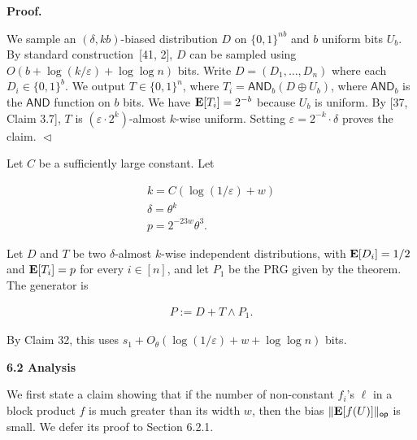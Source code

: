\documentclass[10pt,a4paper]{article}
\begin{document}



\par\medskip\noindent\textbf{
\textbf{Proof}.}\par




We sample an $(\delta,kb)$-biased distribution $D$ on $\{0,1\}^{nb}$ and $b$ uniform bits $U_{b}$.
By standard construction [41, 2], $D$ can be sampled using $O(b+\log(k/\varepsilon)+\log\log n)$ bits.
Write $D=(D_{1},\ldots,D_{n})$ where each $D_{i}\in\{0,1\}^{b}$.
We output $T\in\{0,1\}^{n}$, where $T_{i}=\mathsf{AND}_{b}(D\oplus U_{b})$, where $\mathsf{AND}_{b}$ is the $\mathsf{AND}$ function on $b$ bits.
We have $\mathop{\bf E\/}[T_{i}]=2^{-b}$ because $U_{b}$ is uniform.
By [37, Claim 3.7], $T$ is $(\varepsilon\cdot 2^{k})$-almost $k$-wise uniform.
Setting $\varepsilon=2^{-k}\cdot\delta$ proves the claim.
$\vartriangleleft$\par




Let $C$ be a sufficiently large constant.
Let\par


\[\begin{gathered}
\displaystyle k \displaystyle=C(\log(1/\varepsilon)+w) \\
\displaystyle\delta \displaystyle=\theta^{k} \\
\displaystyle p \displaystyle=2^{-23w}\theta^{3}.
\end{gathered}\]


Let $D$ and $T$ be two $\delta$-almost $k$-wise independent distributions, with $\mathop{\bf E\/}[D_{i}]=1/2$ and $\mathop{\bf E\/}[T_{i}]=p$ for every $i\in[n]$, and let $P_{1}$ be the PRG given by the theorem.
The generator is\par


\[\begin{gathered}
P:=D+T\wedge P_{1}.
\end{gathered}\]


By Claim 32, this uses $s_{1}+O_{\theta}(\log(1/\varepsilon)+w+\log\log n)$ bits.\par






\par\medskip\noindent\textbf{
6.2 Analysis}\par




We first state a claim showing that if the number of non-constant $f_{i}$’s $\ell$ in a block product $f$ is much greater than its width $w$, then the bias $\lVert\mathop{\bf E\/}[f(U)]\rVert_{\mathsf{op}}$ is small.
We defer its proof to Section 6.2.1.\par
\end{document}
